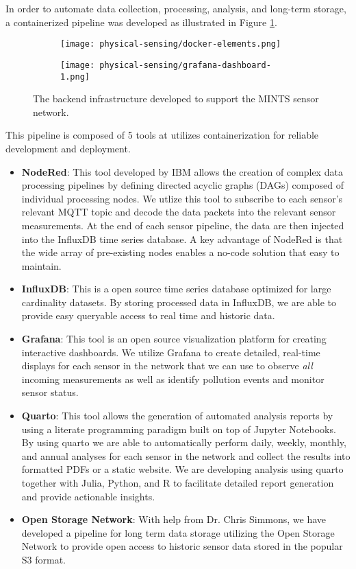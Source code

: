 In order to automate data collection, processing, analysis, and long-term storage, a containerized pipeline was developed as illustrated in Figure \ref{fig:dashboards}.
\begin{figure}[!hbt]
  \begin{subfigure}{.2\textwidth}
    \centering
    \texttt{[image: physical-sensing/docker-elements.png]}
    \caption{}
  \end{subfigure}
  \begin{subfigure}{.8\textwidth}
    \centering
    \texttt{[image: physical-sensing/grafana-dashboard-1.png]}
    \caption{}
  \end{subfigure}
  \caption{The backend infrastructure developed to support the MINTS sensor network.}
  \label{fig:dashboards}
\end{figure}
This pipeline is composed of 5 tools at utilizes containerization for reliable development and deployment.
\begin{itemize}
\item \textbf{NodeRed}: This tool developed by IBM allows the creation of complex data processing pipelines by defining directed acyclic graphs (DAGs) composed of individual processing nodes. We utlize this tool to subscribe to each sensor's relevant MQTT topic and decode the data packets into the relevant sensor measurements. At the end of each sensor pipeline, the data are then injected into the InfluxDB time series database. A key advantage of NodeRed is that the wide array of pre-existing nodes enables a no-code solution that easy to maintain.
\item \textbf{InfluxDB}: This is a open source time series database optimized for large cardinality datasets. By storing processed data in InfluxDB, we are able to provide easy queryable access to real time and historic data.
\item \textbf{Grafana}: This tool is an open source visualization platform for creating interactive dashboards. We utilize Grafana to create detailed, real-time displays for each sensor in the network that we can use to observe \textit{all} incoming measurements as well as identify pollution events and monitor sensor status.
\item \textbf{Quarto}: This tool allows the generation of automated analysis reports by using a literate programming paradigm built on top of Jupyter Notebooks. By using quarto we are able to automatically perform daily, weekly, monthly, and annual analyses for each sensor in the network and collect the results into formatted PDFs or a static website. We are developing analysis using quarto together with Julia, Python, and R to facilitate detailed report generation and provide actionable insights.
\item \textbf{Open Storage Network}: With help from Dr. Chris Simmons, we have developed a pipeline for long term data storage utilizing the Open Storage Network to provide open access to historic sensor data stored in the popular S3 format.
\end{itemize}
